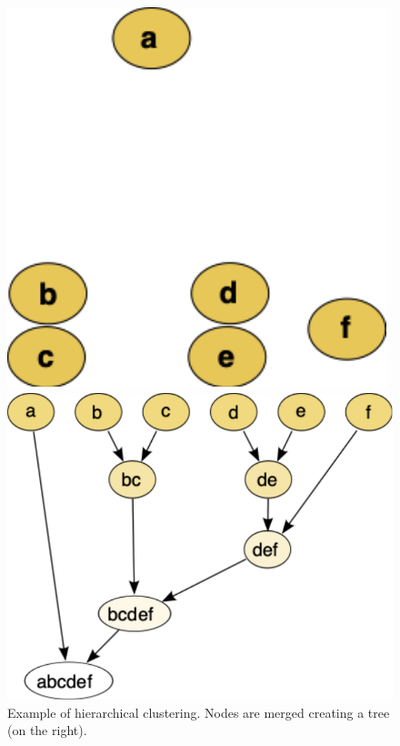 \begin{figure}[htb!]
	\centering
	\begin{minipage}{0.35\textwidth}
		\includegraphics[width=0.8\linewidth]{pictures/topic/clusters.pdf}
	\end{minipage}
\hspace{3mm}
	\begin{minipage}{0.35\textwidth}
			\includegraphics[width=0.9\linewidth]{pictures/topic/hierarchical_clustering_simple_diagram.pdf}
	\end{minipage}
\caption{Example of hierarchical clustering. Nodes are merged creating a tree (on the right).}
\label{fig:topic/hc}
\end{figure}

